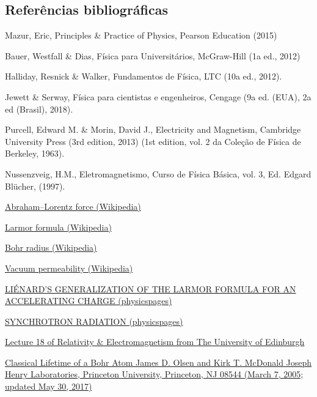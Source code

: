 \documentclass[12pt, letterpaper]{article}
\begin{document}
    \subsection{Referências bibliográficas}
    Mazur, Eric, Principles \& Practice of Physics, Pearson Education (2015)

    Bauer, Westfall \& Dias, Física para Universitários, McGraw-Hill  (1a ed., 2012)

    Halliday, Resnick \& Walker, Fundamentos de Física, LTC (10a ed., 2012).

    Jewett \& Serway, Física para cientistas e engenheiros, Cengage (9a ed. (EUA), 2a ed (Brasil), 2018).

    Purcell, Edward M. \& Morin, David J., Electricity and Magnetism, Cambridge University Press (3rd edition, 2013) (1st edition, vol. 2 da Coleção de Física de Berkeley, 1963).

    Nussenzveig, H.M., Eletromagnetismo, Curso de Física Básica, vol. 3, Ed. Edgard Blücher, (1997).


    \href{https://en.wikipedia.org/wiki/Abraham\%E2\%80\%93Lorentz_force}{Abraham–Lorentz force (Wikipedia)}

    \href{https://en.wikipedia.org/wiki/Larmor_formula}{Larmor formula (Wikipedia)}

    \href{https://en.wikipedia.org/wiki/Bohr_radius}{Bohr radius (Wikipedia)}

    \href{https://en.wikipedia.org/wiki/Vacuum_permeability}{Vacuum permeability (Wikipedia)}    

    \href{http://physicspages.com/pdf/Electrodynamics/Li%C3%A9nard%27s%20generalization%20of%20the%20Larmor%20formula%20for%20an%20accelerating%20charge.pdf}{LIÉNARD’S GENERALIZATION OF THE LARMOR FORMULA FOR AN ACCELERATING CHARGE (physicspages)}

    \href{https://physicspages.com/pdf/Electrodynamics/Synchrotron%20radiation.pdf}{SYNCHROTRON RADIATION (physicspages)}

    \href{https://www2.ph.ed.ac.uk/~playfer/EMlect18.pdf}{Lecture 18 of Relativity \& Electromagnetism from The University of Edinburgh}

    \href{https://www.physics.princeton.edu/~mcdonald/examples/orbitdecay.pdf}{Classical Lifetime of a Bohr Atom James D. Olsen and Kirk T. McDonald Joseph Henry Laboratories, Princeton University, Princeton, NJ 08544 (March 7, 2005; updated May 30, 2017)}
\end{document}
